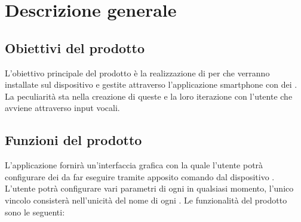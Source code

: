 \clearpage
\section{Descrizione generale}
\label{sec:desc_gen}
\subsection{Obiettivi del prodotto}
L'obiettivo principale del prodotto è la realizzazione di  per   che verranno installate sul dispositivo e gestite attraverso l'applicazione smartphone con dei . La peculiarità sta nella creazione di queste  e la loro iterazione con l'utente che avviene attraverso input vocali.
\subsection{Funzioni del prodotto}
L'applicazione fornirà un'interfaccia grafica con la quale l'utente potrà configurare dei  da far eseguire tramite apposito comando dal dispositivo  . L'utente potrà configurare vari parametri di ogni  in qualsiasi momento, l'unico vincolo consisterà nell'unicità del nome di ogni .
Le funzionalità del prodotto sono le seguenti: 
